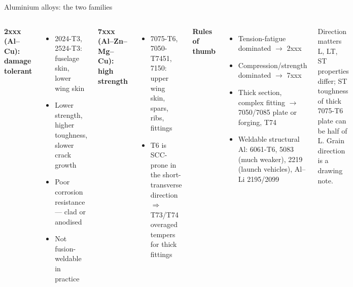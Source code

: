 \documentclass[aspectratio=169,10pt]{beamer}
\begin{document}
\begin{frame}{Aluminium alloys: the two families}
\begin{columns}[T]
\textbf{2xxx (Al--Cu): damage tolerant}
\begin{itemize}
  \item 2024-T3, 2524-T3: fuselage skin, lower wing skin
  \item Lower strength, higher toughness, slower crack growth
  \item Poor corrosion resistance --- clad or anodised
  \item Not fusion-weldable in practice
\end{itemize}
\textbf{7xxx (Al--Zn--Mg--Cu): high strength}
\begin{itemize}
  \item 7075-T6, 7050-T7451, 7150: upper wing skin, spars, ribs, fittings
  \item T6 is SCC-prone in the short-transverse direction $\Rightarrow$ T73/T74 overaged tempers for thick fittings
\end{itemize}
\textbf{Rules of thumb}
\begin{itemize}
  \item Tension-fatigue dominated $\rightarrow$ 2xxx
  \item Compression/strength dominated $\rightarrow$ 7xxx
  \item Thick section, complex fitting $\rightarrow$ 7050/7085 plate or forging, T74
  \item Weldable structural Al: 6061-T6, 5083 (much weaker), 2219 (launch vehicles), Al--Li 2195/2099
\end{itemize}
\begin{alertblock}{Direction matters}
L, LT, ST properties differ; ST toughness of thick 7075-T6 plate can be half of L. Grain direction is a drawing note.
\end{alertblock}
\end{columns}
\end{frame}
\end{document}
